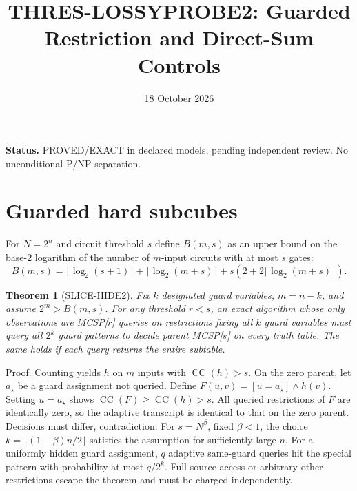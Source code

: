 \documentclass[11pt]{article}
\title{THRES-LOSSYPROBE2: Guarded Restriction and Direct-Sum Controls}
\date{18 October 2026}
\newtheorem{theorem}{Theorem}
\begin{document}
\maketitle
\noindent\textbf{Status.} PROVED/EXACT in declared models,
pending independent review. No unconditional P/NP separation.
\section{Guarded hard subcubes}
For $N=2^n$ and circuit threshold $s$ define
$B(m,s)$ as an upper bound on the base-2 logarithm
of the number of $m$-input circuits with at most $s$ gates:
\[
 B(m,s)=\lceil\log_2(s+1)\rceil+
 \lceil\log_2(m+s)\rceil+
 s(2+2\lceil\log_2(m+s)\rceil).
\]
\begin{theorem}[SLICE-HIDE2]
Fix $k$ designated guard variables, $m=n-k$,
and assume $2^m>B(m,s)$. For any threshold $r<s$,
an exact algorithm whose only observations are
MCSP[$r$] queries on restrictions fixing all $k$
guard variables must query all $2^k$ guard patterns
to decide parent MCSP[$s$] on every truth table.
The same holds if each query returns the entire subtable.
\end{theorem}
\noindent Proof. Counting yields $h$ on $m$ inputs
with $\operatorname{CC}(h)>s$. On the zero parent,
let $a_\star$ be a guard assignment not queried.
Define $F(u,v)=[u=a_\star]\wedge h(v)$.
Setting $u=a_\star$ shows
$\operatorname{CC}(F)\ge\operatorname{CC}(h)>s$.
All queried restrictions of $F$ are identically zero,
so the adaptive transcript is identical to that on
the zero parent. Decisions must differ, contradiction.
For $s=N^\beta$, fixed $\beta<1$, the choice
$k=\lfloor(1-\beta)n/2\rfloor$ satisfies the
assumption for sufficiently large $n$.
For a uniformly hidden guard assignment,
$q$ adaptive same-guard queries hit the special
pattern with probability at most $q/2^k$.
Full-source access or arbitrary other restrictions
escape the theorem and must be charged independently.
\end{document}
